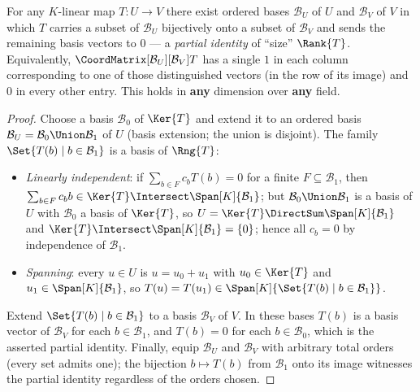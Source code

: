 \begin{theorem}
\label{thm:rank-normal-form}
    For any $K$-linear map $T: U \to V$ there exist ordered bases $\mathcal{B}_U$ of $U$ and
    $\mathcal{B}_V$ of $V$ in which $T$ carries a subset of $\mathcal{B}_U$ bijectively onto a
    subset of $\mathcal{B}_V$ and sends the remaining basis vectors to $0$ --- a \emph{partial
    identity} of ``size'' $\Rank{T}$. Equivalently, $\CoordMatrix[\mathcal{B}_U][\mathcal{B}_V]{T}$
    has a single $1$ in each column corresponding to one of those distinguished vectors (in the
    row of its image) and $0$ in every other entry. This holds in \textbf{any} dimension over
    \textbf{any} field.
\end{theorem}

\begin{proof}
    Choose a basis $\mathcal{B}_0$ of $\Ker{T}$ and extend it to an ordered basis
    $\mathcal{B}_U = \mathcal{B}_0 \Union \mathcal{B}_1$ of $U$ (basis extension; the union is
    disjoint). The family $\Set{T(b) \mid b \in \mathcal{B}_1}$ is a basis of $\Rng{T}$:
    \begin{itemize}
        \item \emph{Linearly independent}: if $\sum_{b \in F} c_b T(b) = 0$ for a finite
              $F \subseteq \mathcal{B}_1$, then $\sum_{b \in F} c_b b \in \Ker{T} \Intersect
              \Span[K]{\mathcal{B}_1}$; but $\mathcal{B}_0 \Union \mathcal{B}_1$ is a basis of $U$
              with $\mathcal{B}_0$ a basis of $\Ker{T}$, so $U = \Ker{T} \DirectSum
              \Span[K]{\mathcal{B}_1}$ and $\Ker{T} \Intersect \Span[K]{\mathcal{B}_1} = \{0\}$;
              hence all $c_b = 0$ by independence of $\mathcal{B}_1$.
        \item \emph{Spanning}: every $u \in U$ is $u = u_0 + u_1$ with $u_0 \in \Ker{T}$ and
              $u_1 \in \Span[K]{\mathcal{B}_1}$, so $T(u) = T(u_1) \in \Span[K]{\Set{T(b) \mid b
              \in \mathcal{B}_1}}$.
    \end{itemize}
    Extend $\Set{T(b) \mid b \in \mathcal{B}_1}$ to a basis $\mathcal{B}_V$ of $V$. In these bases
    $T(b)$ is a basis vector of $\mathcal{B}_V$ for each $b \in \mathcal{B}_1$, and $T(b) = 0$ for
    each $b \in \mathcal{B}_0$, which is the asserted partial identity. Finally, equip
    $\mathcal{B}_U$ and $\mathcal{B}_V$ with arbitrary total orders (every set admits one); the
    bijection $b \mapsto T(b)$ from $\mathcal{B}_1$ onto its image witnesses the partial identity
    regardless of the orders chosen.
\end{proof}

